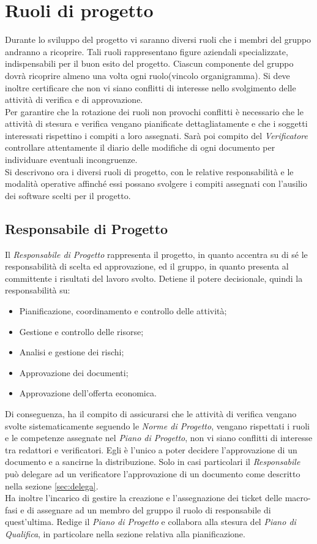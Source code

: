 \section{Ruoli di progetto}
Durante lo sviluppo del progetto vi saranno diversi ruoli che i membri del gruppo andranno a ricoprire. Tali ruoli rappresentano figure aziendali specializzate, indispensabili per il buon esito del progetto. Ciascun componente del gruppo dovrà ricoprire almeno una volta ogni ruolo(vincolo organigramma). Si deve inoltre certificare che non vi siano conflitti di interesse nello svolgimento delle attività di verifica e di approvazione.\\
Per garantire che la rotazione dei ruoli non provochi conflitti è necessario che le attività di stesura e verifica vengano pianificate dettagliatamente e che i soggetti interessati rispettino i compiti a loro assegnati. Sarà poi compito del \textit{Verificatore} controllare attentamente il diario delle modifiche di ogni documento per individuare eventuali incongruenze.\\
Si descrivono ora i diversi ruoli di progetto, con le relative responsabilità e le modalità operative affinché essi possano svolgere i compiti assegnati con l'ausilio dei software scelti per il progetto.
\subsection{Responsabile di Progetto}
Il \textit{Responsabile di Progetto} rappresenta il progetto, in quanto accentra su di sé le responsabilità di scelta ed approvazione, ed il gruppo, in quanto presenta al committente i risultati del lavoro svolto.
Detiene il potere decisionale, quindi la responsabilità su:
\begin{itemize}
\item Pianificazione, coordinamento e controllo delle attività;
\item Gestione e controllo delle risorse;
\item Analisi e gestione dei rischi;
\item Approvazione dei documenti;
\item Approvazione dell'offerta economica.
\end{itemize}
Di conseguenza, ha il compito di assicurarsi che le attività di verifica vengano svolte sistematicamente seguendo le \textit{Norme di Progetto}, vengano rispettati i ruoli e le competenze assegnate nel \textit{Piano di Progetto}, non vi siano conflitti di interesse tra redattori e verificatori. Egli è l'unico a poter decidere l'approvazione di un documento e a sancirne
la distribuzione. Solo in casi particolari il \textit{Responsabile} può delegare ad un verificatore l'approvazione di un documento come descritto nella sezione \ref{sec:delega}. \\
Ha inoltre l'incarico di gestire la creazione e l'assegnazione dei ticket delle macro-fasi e di assegnare ad un membro del gruppo il ruolo di responsabile di quest’ultima.
Redige il \textit{Piano di Progetto} e collabora alla stesura del \textit{Piano di Qualifica}, in particolare nella sezione relativa alla pianificazione.

